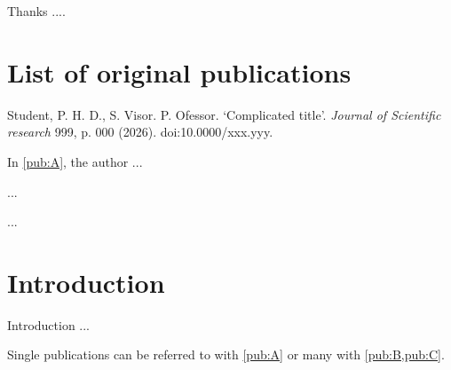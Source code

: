 \documentclass{dissunihel}
\begin{document}
Thanks ....

\tableofcontents

\chapter*{List of original publications}
\begin{publications}
    
    \item\label{pub:A}
    Student, P. H. D., S. Visor. P. Ofessor. ‘Complicated title’. \textit{Journal of Scientific research} 999, p. 000 (2026). doi:10.0000/xxx.yyy.
    
    In \cref{pub:A}, the author ...
    
    \item\label{pub:B}
    ...
    
    \item\label{pub:C}
    ...
    
\end{publications}


\mainmatter  %
\chapter{Introduction}

Introduction ...

Single publications can be referred to with \cref{pub:A} or many with \cref{pub:B,pub:C}.

\end{document}
